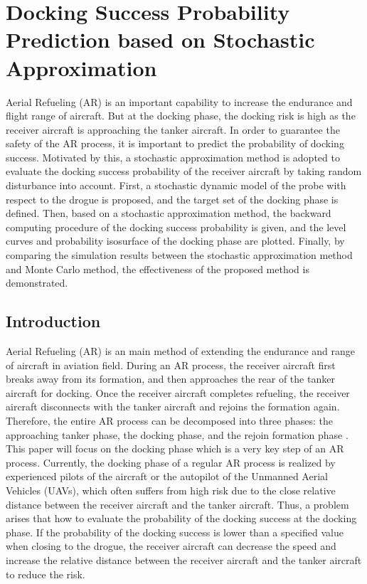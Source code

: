 
\chapter{Docking Success Probability Prediction based on Stochastic Approximation}

Aerial Refueling (AR) is an important capability to increase the endurance and flight range of aircraft. But at the docking phase, the docking risk is high as the receiver aircraft is approaching the tanker aircraft. In order to guarantee the safety of the AR process, it is important to predict the probability of docking success. Motivated by this, a stochastic approximation method is adopted to evaluate the docking success probability of the receiver aircraft by taking random disturbance into account. First, a stochastic dynamic model of the probe with respect to the drogue is proposed, and the target set of the docking phase is defined. Then, based on a stochastic approximation method, the backward computing procedure of the docking success probability is given, and the level curves and probability isosurface of the docking phase are plotted. Finally, by comparing the simulation results between the stochastic approximation method and Monte Carlo method, the effectiveness of the proposed method is demonstrated.

\section{Introduction}\label{section1}
Aerial Refueling (AR) is an main method of extending the endurance and range of aircraft in aviation field\cite{nalepka2005automated,quan2014survey}. During an AR process, the receiver aircraft first breaks away from its formation, and then approaches the rear of the tanker aircraft for docking. Once the receiver aircraft completes refueling, the receiver aircraft disconnects with the tanker aircraft and rejoins the formation again. Therefore, the entire AR process can be decomposed into three phases: the approaching tanker phase, the docking phase, and the rejoin formation phase \cite{thomas2014advances}. This paper will focus on the docking phase which is a very key step of an AR process. Currently, the docking phase of a regular AR process is realized by experienced pilots of the aircraft or the autopilot of the Unmanned Aerial Vehicles (UAVs), which often suffers from high risk due to the close relative distance between the receiver aircraft and the tanker aircraft. Thus, a problem arises that how to evaluate the probability of the docking success at the docking phase. If the probability of the docking success is lower than a specified value when closing to the drogue, the receiver aircraft can decrease the speed and increase the relative distance between the receiver aircraft and the tanker aircraft to reduce the risk.

